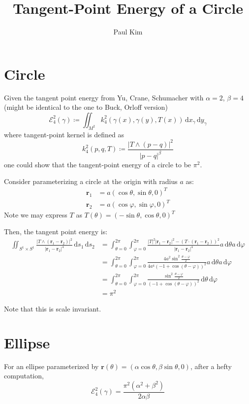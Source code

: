 \documentclass[a4paper]{article}
\title{Tangent-Point Energy of a Circle}
\author{Paul Kim}
\newcommand{\dx}{\, \text{d} x}
\newcommand{\dy}{\, \text{d} y}
\newcommand{\ds}{\, \text{d} s}
\newcommand{\dt}{\, \text{d} \theta}
\newcommand{\dphi}{\, \text{d} \varphi}
\newcommand{\rb}{\mathbf{r}}
\begin{document}
\maketitle

\section{Circle}
Given the tangent point energy from Yu, Crane, Schumacher with $\alpha = 2$, $\beta = 4$
(might be identical to the one to Buck, Orloff version)
\begin{equation}
    \mathcal{E}_{4}^2 \left( \gamma \right) \coloneqq \iint_{M^2} k_{4}^2 \left( \gamma (x), \gamma (y), T(x) \right) \dx_{\gamma} \dy_{\gamma}
    \label{equ: Energy}
\end{equation}
where tangent-point kernel is defined as
\begin{equation}
    k_{4}^2 (p, q, T) \coloneqq \frac{|T \wedge \left( p - q \right)|^2}{|p-q|^\beta}
\end{equation}
one could show that the tangent-point energy of a circle to be $\pi^2$.

Consider parameterizing a circle at the origin with radius $a$ as:
\begin{align}
    \rb_1 &= a \left( \cos \theta, \sin \theta, 0 \right) ^ T \\
    \rb_2 &= a \left( \cos \varphi, \sin \varphi, 0 \right) ^ T
\end{align}
Note we may express $T$ as $T\left( \theta \right) = \left( - \sin \theta, \cos \theta, 0 \right) ^ T$

Then, the tangent point energy is:
\begin{align}
    \iint_{S^1 \times S^1} \frac{|T \wedge \left( \rb_1 - \rb_2 \right)|^2}{|\rb_1 - \rb_2|^4} \ds_1 \ds_2
    &= \int_{\theta = 0}^{2 \pi} \int_{\varphi = 0}^{2 \pi} \frac{|T|^2 |\rb_1 - \rb_2|^2 - \left( T \cdot \left( \rb_1 - \rb_2 \right) \right)^2}{|\rb_1 - \rb_2|^4} a \dt a \dphi \\
    &= \int_{\theta = 0}^{2 \pi} \int_{\varphi = 0}^{2 \pi} \frac{4 a^2 \sin^2 \frac{\theta - \varphi}{2}}{4 a^4 \left( -1 + \cos \left( \theta - \varphi \right) \right)^2} a \dt a \dphi \\
    &= \int_{\theta = 0}^{2 \pi} \int_{\varphi = 0}^{2 \pi} \frac{\sin^2 \frac{\theta - \varphi}{2}}{\left( -1 + \cos \left( \theta - \varphi \right) \right)^2} \dt \dphi \\
    &= \pi^2
\end{align}

Note that this is scale invariant.

\section{Ellipse}
For an ellipse parameterized by $\mathbf{r}(\theta) = \left( \alpha \cos {\theta}, \beta \sin {\theta}, 0 \right)$, after a hefty computation,
\begin{equation}
    \mathcal{E}_{4}^{2} (\gamma) = \frac{\pi^{2} \left( \alpha^{2} + \beta^{2} \right)}{2 \alpha \beta}
\end{equation}
\end{document}
